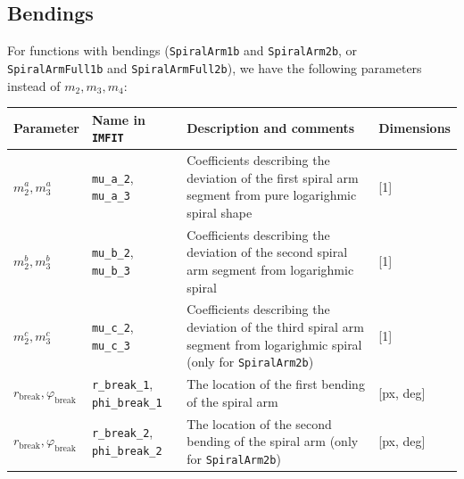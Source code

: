 \documentclass[12pt,a4paper]{article}
\begin{document}
\begin{table}[h]
\subsection{Bendings}
	For functions with bendings (\verb*|SpiralArm1b| and \verb*|SpiralArm2b|, or \verb*|SpiralArmFull1b| and \verb*|SpiralArmFull2b|), we have the following parameters instead of $m_2, m_3, m_4$:\\
	\begin{tabularx}{\textwidth}{|L{0.6}|L{0.6}|L{1.8}|l|}
		\hline
		Parameter & Name in \verb*|IMFIT| & Description and comments & Dimensions \\
		\hline
		$m^a_2, m^a_3$ & \verb*|mu_a_2|, \verb*|mu_a_3| & Coefficients describing the deviation of the first spiral arm segment from pure logarighmic spiral shape & [1] \\
		\hline
		$m^b_2, m^b_3$ & \verb*|mu_b_2|, \verb*|mu_b_3| & Coefficients describing the deviation of the second spiral arm segment from logarighmic spiral & [1] \\
		\hline
		$m^c_2, m^c_3$ & \verb*|mu_c_2|, \verb*|mu_c_3| & Coefficients describing the deviation of the third spiral arm segment from logarighmic spiral (only for \verb*|SpiralArm2b|) & [1] \\
		\hline
		$r_\text{break}, \varphi_\text{break}$ & \verb*|r_break_1|, \verb*|phi_break_1| & The location of the first bending of the spiral arm & [px, deg] \\
		\hline
		$r_\text{break}, \varphi_\text{break}$ & \verb*|r_break_2|, \verb*|phi_break_2| & The location of the second bending of the spiral arm (only for \verb*|SpiralArm2b|) & [px, deg] \\
		\hline
	\end{tabularx}
\end{table}
\end{document}

